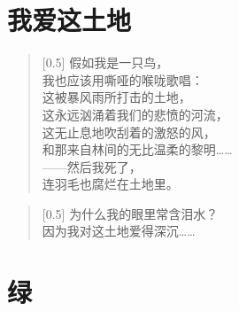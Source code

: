 \documentclass[12pt,UTF-8,openany]{ctexbook}
\begin{document}
\chapter{我爱这土地}

\begin{large}
    
    \begin{verse}[0.5\linewidth]
        假如我是一只鸟， \\
        我也应该用嘶哑的喉咙歌唱： \\
        这被暴风雨所打击的土地， \\
        这永远汹涌着我们的悲愤的河流， \\
        这无止息地吹刮着的激怒的风， \\
        和那来自林间的无比温柔的黎明…… \\
        ——然后我死了， \\
        连羽毛也腐烂在土地里。
    \end{verse}
    
    
    \begin{verse}[0.5\linewidth]
        为什么我的眼里常含泪水？ \\
        因为我对这土地爱得深沉……
    \end{verse}
    
\end{large}



\chapter{绿}
\end{document}
